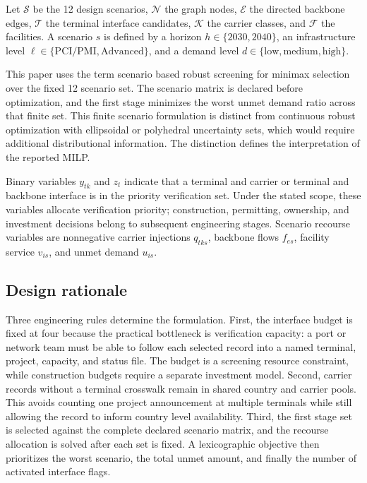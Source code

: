\documentclass{ieeeaccess}
\begin{document}
Let $\mathcal{S}$ be the 12 design scenarios, $\mathcal{N}$ the graph nodes, $\mathcal{E}$ the directed backbone edges, $\mathcal{T}$ the terminal interface candidates, $\mathcal{K}$ the carrier classes, and $\mathcal{F}$ the facilities. A scenario $s$ is defined by a horizon $h\in\{2030,2040\}$, an infrastructure level $\ell\in\{\mathrm{PCI/PMI},\mathrm{Advanced}\}$, and a demand level $d\in\{\mathrm{low},\mathrm{medium},\mathrm{high}\}$.

This paper uses the term scenario based robust screening for minimax selection over the fixed 12 scenario set. The scenario matrix is declared before optimization, and the first stage minimizes the worst unmet demand ratio across that finite set. This finite scenario formulation is distinct from continuous robust optimization with ellipsoidal or polyhedral uncertainty sets, which would require additional distributional information. The distinction defines the interpretation of the reported MILP.

Binary variables $y_{tk}$ and $z_t$ indicate that a terminal and carrier or terminal and backbone interface is in the priority verification set. Under the stated scope, these variables allocate verification priority; construction, permitting, ownership, and investment decisions belong to subsequent engineering stages. Scenario recourse variables are nonnegative carrier injections $q_{tks}$, backbone flows $f_{es}$, facility service $v_{is}$, and unmet demand $u_{is}$.

\subsection{Design rationale}

Three engineering rules determine the formulation. First, the interface budget is fixed at four because the practical bottleneck is verification capacity: a port or network team must be able to follow each selected record into a named terminal, project, capacity, and status file. The budget is a screening resource constraint, while construction budgets require a separate investment model. Second, carrier records without a terminal crosswalk remain in shared country and carrier pools. This avoids counting one project announcement at multiple terminals while still allowing the record to inform country level availability. Third, the first stage set is selected against the complete declared scenario matrix, and the recourse allocation is solved after each set is fixed. A lexicographic objective then prioritizes the worst scenario, the total unmet amount, and finally the number of activated interface flags.
\end{document}
